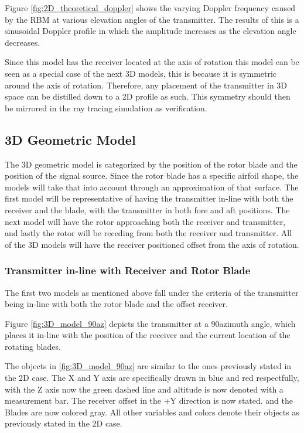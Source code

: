 Figure \ref{fig:2D_theoretical_doppler} shows the varying Doppler frequency caused by the RBM at various elevation angles of the transmitter. The results of this is a sinusoidal Doppler profile in which the amplitude increases as the elevation angle decreases. 

Since this model has the receiver located at the axis of rotation this model can be seen as a special case of the next 3D models, this is because it is symmetric around the axis of rotation. Therefore, any placement of the transmitter in 3D space can be distilled down to a 2D profile as such. This symmetry should then be mirrored in the ray tracing simulation as verification.

\subsection{3D Geometric Model}
The 3D geometric model is categorized by the position of the rotor blade and the position of the signal source. Since the rotor blade has a specific airfoil shape, the models will take that into account through an approximation of that surface. The first model will be representative of having the transmitter in-line with both the receiver and the blade, with the transmitter in both fore and aft positions. The next model will have the rotor approaching both the receiver and transmitter, and lastly the rotor will be receding from both the receiver and transmitter. All of the 3D models will have the receiver positioned offset from the axis of rotation.

\subsubsection{Transmitter in-line with Receiver and Rotor Blade}
The first two models as mentioned above fall under the criteria of the transmitter being in-line with both the rotor blade and the offset receiver. 

Figure \ref{fig:3D_model_90az} depicts the transmitter at a 90\textdegree \space azimuth angle, which places it in-line with the position of the receiver and the current location of the rotating blades. 

The objects in \ref{fig:3D_model_90az}  are similar to the ones previously stated in the 2D case. The X and Y axis are specifically drawn in blue and red respectfully, with the Z axis now the green dashed line and altitude is now denoted with a measurement bar. The receiver offset in the +Y direction is now stated. and the Blades are now colored gray. All other variables and colors denote their objects as previously stated in the 2D case. 

